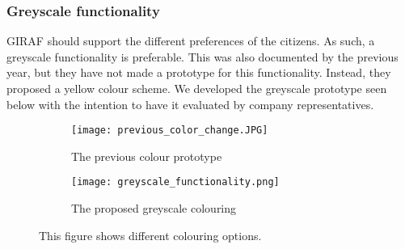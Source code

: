 \subsubsection{Greyscale functionality}
GIRAF should support the different preferences of the citizens. 
As such, a greyscale functionality is preferable.
This was also documented by the previous year, but they have not made a prototype for this functionality.
Instead, they proposed a yellow colour scheme.
We developed the greyscale prototype seen below with the intention to have it evaluated by company representatives.
\begin{figure}[H]
    \begin{subfigure}{0.5\textwidth}
    \texttt{[image: previous\_color\_change.JPG]} 
    \caption{The previous colour prototype}
    \label{fig:previous_citizen_select}
    \end{subfigure}
    \begin{subfigure}{0.5\textwidth}
        \texttt{[image: greyscale\_functionality.png]}
    \caption{The proposed greyscale colouring}
    \label{fig:new_citizen_select}
    \end{subfigure} 
    \caption{This figure shows different colouring options.}
    \label{fig:citizen_select}
\end{figure}

